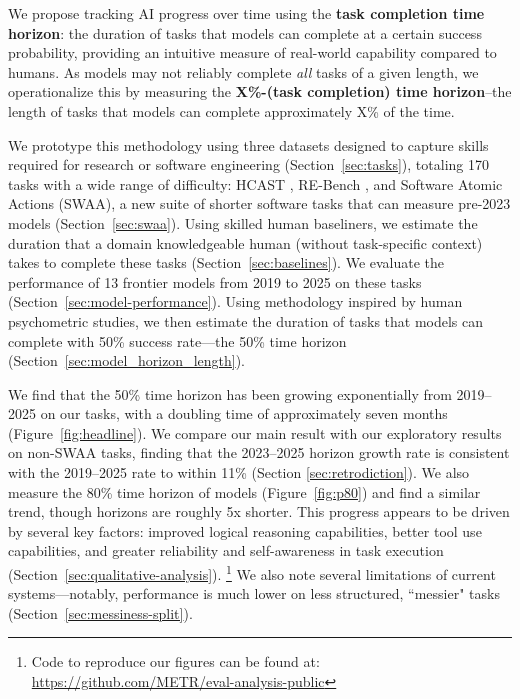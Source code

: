 \documentclass{article}
\newcommand{\gabenchmark}{HCAST}
\newcommand{\numtasks}{170}
\begin{document}
We propose tracking AI progress over time using the \textbf{task completion time horizon}: the duration of tasks that models can complete at a certain success probability, providing an intuitive measure of real-world capability compared to humans. 
As models may not reliably complete \emph{all} tasks of a given length, we operationalize this by measuring the \textbf{X\%-(task completion) time horizon}--the length of tasks that models can complete approximately X\% of the time.

We prototype this methodology using three datasets designed to capture skills required for research or software engineering (Section~\ref{sec:tasks}), totaling \numtasks{} tasks with a wide range of difficulty: \gabenchmark{} \citep{METR_HCAST}, RE-Bench \cite{wijk2024re}, and Software Atomic Actions (SWAA), a new suite of shorter software tasks that can measure pre-2023 models (Section~\ref{sec:swaa}). 
Using skilled human baseliners, we estimate the duration that a domain knowledgeable human (without task-specific context) takes to complete these tasks (Section~\ref{sec:baselines}). 
We evaluate the performance of 13 frontier models from 2019 to 2025 on these tasks (Section~\ref{sec:model-performance}). Using methodology inspired by human psychometric studies, we then estimate the duration of tasks that models can complete with 50\% success rate---the 50\% time horizon (Section~\ref{sec:model_horizon_length}).

We find that the 50\% time horizon has been growing exponentially from 2019--2025 on our tasks, with a doubling time of approximately seven months (Figure~\ref{fig:headline}). We compare our main result with our exploratory results on non-SWAA tasks, finding that the 2023--2025 horizon growth rate is consistent with the 2019--2025 rate to within 11\% (Section \ref{sec:retrodiction}).
We also measure the 80\% time horizon of models (Figure~\ref{fig:p80}) and find a similar trend, though horizons are roughly 5x shorter. 
This progress appears to be driven by several key factors: improved logical reasoning capabilities, better tool use capabilities, and greater reliability and self-awareness in task execution (Section~\ref{sec:qualitative-analysis}).
\footnote{Code to reproduce our figures can be found at: \url{https://github.com/METR/eval-analysis-public}}
We also note several limitations of current systems---notably, performance is much lower on less structured, ``messier" tasks (Section~\ref{sec:messiness-split}). 
\end{document}
